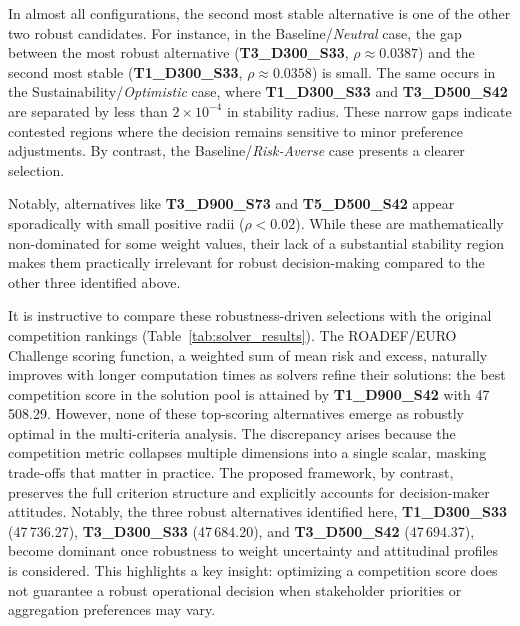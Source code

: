 In almost all configurations, the second most stable alternative is one of the other two robust candidates. For instance, in the Baseline/\textit{Neutral} case, the gap between the most robust alternative (\textbf{T3\_D300\_S33}, $\rho \approx 0.0387$) and the second most stable (\textbf{T1\_D300\_S33}, $\rho \approx 0.0358$) is small. The same occurs in the Sustainability/\textit{Optimistic} case, where \textbf{T1\_D300\_S33} and \textbf{T3\_D500\_S42} are separated by less than $2 \times 10^{-4}$ in stability radius. These narrow gaps indicate contested regions where the decision remains sensitive to minor preference adjustments. By contrast, the Baseline/\textit{Risk-Averse} case presents a clearer selection.

Notably, alternatives like \textbf{T3\_D900\_S73} and \textbf{T5\_D500\_S42} appear sporadically with small positive radii ($\rho < 0.02$). While these are mathematically non-dominated for some weight values, their lack of a substantial stability region makes them practically irrelevant for robust decision-making compared to the other three identified above.

It is instructive to compare these robustness-driven selections with the original competition rankings (Table~\ref{tab:solver_results}). The ROADEF/EURO Challenge scoring function, a weighted sum of mean risk and excess, naturally improves with longer computation times as solvers refine their solutions: the best competition score in the solution pool is attained by \textbf{T1\_D900\_S42} with 47\,508.29. However, none of these top-scoring alternatives emerge as robustly optimal in the multi-criteria analysis. The discrepancy arises because the competition metric collapses multiple dimensions into a single scalar, masking trade-offs that matter in practice. The proposed framework, by contrast, preserves the full criterion structure and explicitly accounts for decision-maker attitudes. Notably, the three robust alternatives identified here, \textbf{T1\_D300\_S33} (47\,736.27), \textbf{T3\_D300\_S33} (47\,684.20), and \textbf{T3\_D500\_S42} (47\,694.37), become dominant once robustness to weight uncertainty and attitudinal profiles is considered. This highlights a key insight: optimizing a competition score does not guarantee a robust operational decision when stakeholder priorities or aggregation preferences may vary.

